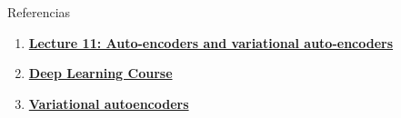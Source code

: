 \documentclass[aspectratio=169]{beamer}
\begin{document}

\begin{frame}[t]{Referencias}
  \begin{enumerate}
    \item \href{https://glouppe.github.io/info8010-deep-learning/?p=lecture11.md}{\textbf{Lecture 11: Auto-encoders and variational auto-encoders}}
    \item \href{https://fleuret.org/dlc/}{\textbf{Deep Learning Course}}
    \item \href{https://www.jeremyjordan.me/variational-autoencoders/}{\textbf{Variational autoencoders}}

  \end{enumerate}
\end{frame}
\end{document}
